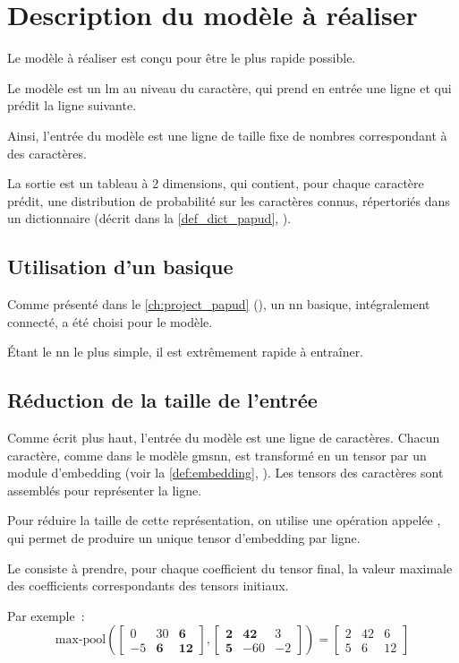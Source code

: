 \chapter{Description du modèle à réaliser}\label{ch:papud_model}
Le modèle à réaliser est conçu pour être le plus rapide possible.

Le modèle est un \gls{lm} au niveau du caractère, qui prend en entrée une ligne et qui prédit la ligne suivante.

Ainsi, l'entrée du modèle est une ligne de taille fixe de nombres correspondant à des caractères.

La sortie est un tableau à 2 dimensions, qui contient, pour chaque caractère prédit, une distribution de probabilité sur les caractères connus, répertoriés dans un dictionnaire (décrit dans la \autoref{def_dict_papud}, ).

\section{Utilisation d'un  basique}
Comme présenté dans le \autoref{ch:project_papud} (), un \gls{nn} basique, intégralement connecté, a été choisi pour le modèle.

Étant le \gls{nn} le plus simple, il est extrêmement rapide à entraîner.

\section{Réduction de la taille de l'entrée}
Comme écrit plus haut, l'entrée du modèle est une ligne de caractères.
Chacun caractère, comme dans le modèle \gls{gmsnn}, est transformé en un \gls{tensor} par un module d'\gls{embedding} (voir la \autoref{def:embedding}, ). Les \glspl{tensor} des caractères sont assemblés pour représenter la ligne.

Pour réduire la taille de cette représentation, on utilise une opération appelée \og {} \fg{}, qui permet de produire un unique \gls{tensor} d'\gls{embedding} par ligne.

Le  consiste à prendre, pour chaque coefficient du \gls{tensor} final, la valeur maximale des coefficients correspondants des \glspl{tensor} initiaux.

Par exemple~:
\[ \text{max-pool}\left(\left[\begin{array}{ccc}0&30&\textbf{6}\\-5&\textbf{6}&\textbf{12}\end{array}\right] , \left[ \begin{array}{ccc}\textbf{2}&\textbf{42}&3\\\textbf{5}&-60&-2\end{array}\right] \right) = \left[\begin{array}{ccc}2&42&6\\5&6&12\end{array}\right]  \]
\vspace{0em}


